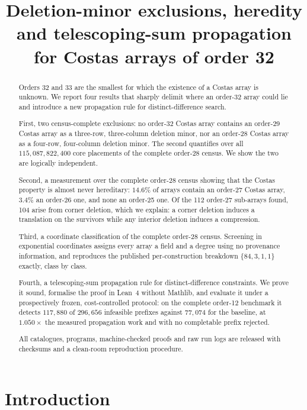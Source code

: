 \documentclass[11pt,a4paper]{article}
\title{Deletion-minor exclusions, heredity and telescoping-sum propagation\\
for Costas arrays of order 32}
\author{}
\date{}
\theoremstyle{definition}
\theoremstyle{remark}
\begin{document}
\maketitle

\begin{abstract}
Orders 32 and 33 are the smallest for which the existence of a Costas array is
unknown. We report four results that sharply delimit where an order-32 array
could lie and introduce a new propagation rule for distinct-difference search.

First, two census-complete exclusions: no order-32 Costas array contains an
order-29 Costas array as a three-row, three-column deletion minor, nor an
order-28 Costas array as a four-row, four-column deletion minor. The second
quantifies over all $115{,}087{,}822{,}400$ core placements of the complete
order-28 census. We show the two are logically independent.

Second, a measurement over the complete order-28 census showing that the Costas
property is almost never hereditary: $14.6\%$ of arrays contain an order-27
Costas array, $3.4\%$ an order-26 one, and none an order-25 one. Of the 112
order-27 sub-arrays found, 104 arise from corner deletion, which we explain: a
corner deletion induces a translation on the survivors while any interior
deletion induces a compression.

Third, a coordinate classification of the complete order-28 census. Screening in
exponential coordinates assigns every array a field and a degree using no
provenance information, and reproduces the published per-construction breakdown
$\{84,3,1,1\}$ exactly, class by class.

Fourth, a telescoping-sum propagation rule for distinct-difference constraints.
We prove it sound, formalise the proof in Lean~4 without Mathlib, and evaluate it
under a prospectively frozen, cost-controlled protocol: on the complete order-12
benchmark it detects $117{,}880$ of $296{,}656$ infeasible prefixes against
$77{,}074$ for the baseline, at $1.050\times$ the measured propagation work and
with no completable prefix rejected.

All catalogues, programs, machine-checked proofs and raw run logs are released
with checksums and a clean-room reproduction procedure.
\end{abstract}

\section{Introduction}
\end{document}
